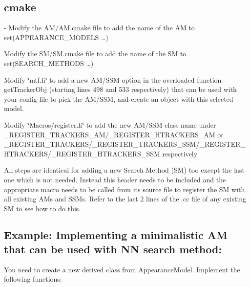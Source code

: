 \subsection*{cmake }


\begin{DoxyEnumerate}
\item -\/ Modify the A\-M/\-A\-M.\-cmake file to add the name of the A\-M to set(A\-P\-P\-E\-A\-R\-A\-N\-C\-E\-\_\-\-M\-O\-D\-E\-L\-S …)
\begin{DoxyItemize}
\item Modify the S\-M/\-S\-M.\-cmake file to add the name of the S\-M to set(S\-E\-A\-R\-C\-H\-\_\-\-M\-E\-T\-H\-O\-D\-S …)
\end{DoxyItemize}
\item Modify \char`\"{}mtf.\-h\char`\"{} to add a new A\-M/\-S\-S\-M option in the overloaded function {\ttfamily get\-Tracker\-Obj} (starting lines 498 and 533 respectively) that can be used with your config file to pick the A\-M/\-S\-S\-M, and create an object with this selected model.
\item Modify \char`\"{}\-Macros/register.\-h\char`\"{} to add the new A\-M/\-S\-S\-M class name under {\ttfamily \-\_\-\-R\-E\-G\-I\-S\-T\-E\-R\-\_\-\-T\-R\-A\-C\-K\-E\-R\-S\-\_\-\-A\-M/\-\_\-\-R\-E\-G\-I\-S\-T\-E\-R\-\_\-\-H\-T\-R\-A\-C\-K\-E\-R\-S\-\_\-\-A\-M} or {\ttfamily \-\_\-\-R\-E\-G\-I\-S\-T\-E\-R\-\_\-\-T\-R\-A\-C\-K\-E\-R\-S/\-\_\-\-R\-E\-G\-I\-S\-T\-E\-R\-\_\-\-T\-R\-A\-C\-K\-E\-R\-S\-\_\-\-S\-S\-M/\-\_\-\-R\-E\-G\-I\-S\-T\-E\-R\-\_\-\-H\-T\-R\-A\-C\-K\-E\-R\-S/\-\_\-\-R\-E\-G\-I\-S\-T\-E\-R\-\_\-\-H\-T\-R\-A\-C\-K\-E\-R\-S\-\_\-\-S\-S\-M} respectively
\end{DoxyEnumerate}

All steps are identical for adding a new Search Method (S\-M) too except the last one which is not needed. Instead this header needs to be included and the appropriate macro needs to be called from its source file to register the S\-M with all existing A\-Ms and S\-S\-Ms. Refer to the last 2 lines of the .cc file of any existing S\-M to see how to do this.

\subsection*{Example\-: Implementing a minimalistic A\-M that can be used with N\-N search method\-: }

You need to create a new derived class from Appearance\-Model. Implement the following functions\-:


